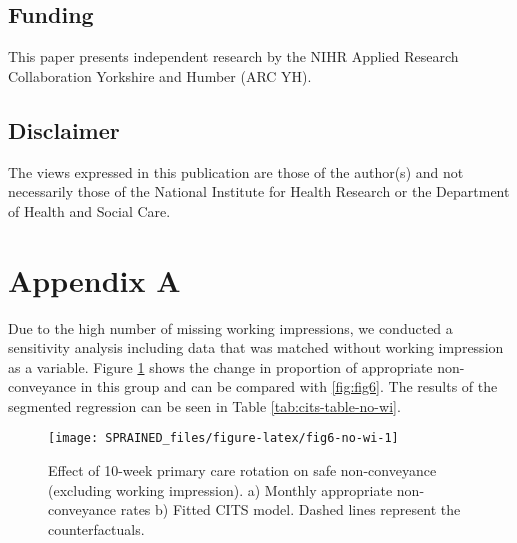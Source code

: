 \documentclass[
  a4paper,
  openany]{article}
\begin{document}
\hypertarget{funding}{%
\subsection*{Funding}\label{funding}}

This paper presents independent research by the NIHR Applied Research Collaboration Yorkshire and Humber (ARC YH).

\hypertarget{disclaimer}{%
\subsection*{Disclaimer}\label{disclaimer}}

The views expressed in this publication are those of the author(s) and not necessarily those of the National Institute for Health Research or the Department of Health and Social Care.

\hypertarget{appendix-a}{%
\section*{Appendix A}\label{appendix-a}}

Due to the high number of missing working impressions, we conducted a sensitivity analysis including data that was matched without working impression as a variable. Figure \ref{fig:fig6-no-wi} shows the change in proportion of appropriate non-conveyance in this group and can be compared with \ref{fig:fig6}. The results of the segmented regression can be seen in Table \ref{tab:cits-table-no-wi}.

\begin{figure}

{\centering \texttt{[image: SPRAINED\_files/figure-latex/fig6-no-wi-1]} 

}

\caption{Effect of 10-week primary care rotation on safe non-conveyance (excluding working impression). a) Monthly appropriate non-conveyance rates b) Fitted CITS model. Dashed lines represent the counterfactuals.}\label{fig:fig6-no-wi}
\end{figure}
\end{document}
